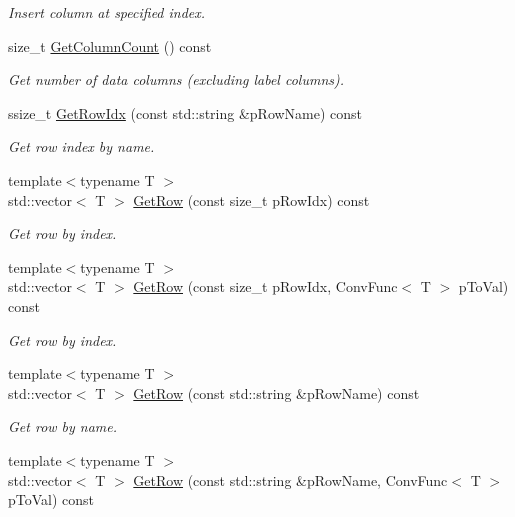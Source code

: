 \begin{DoxyCompactItemize}
\begin{DoxyCompactList}\small\item\em Insert column at specified index. \end{DoxyCompactList}\item 
size\+\_\+t \hyperlink{classrapidcsv_1_1Document_ae56d9b1d6b3b0037371032ba0dc0ee5c}{Get\+Column\+Count} () const
\begin{DoxyCompactList}\small\item\em Get number of data columns (excluding label columns). \end{DoxyCompactList}\item 
ssize\+\_\+t \hyperlink{classrapidcsv_1_1Document_a9c0d1a978bb9b764d13722219b0f4886}{Get\+Row\+Idx} (const std\+::string \&p\+Row\+Name) const
\begin{DoxyCompactList}\small\item\em Get row index by name. \end{DoxyCompactList}\item 
{\footnotesize template$<$typename T $>$ }\\std\+::vector$<$ T $>$ \hyperlink{classrapidcsv_1_1Document_a1523dd4eab5d7268f5c7a64867001595}{Get\+Row} (const size\+\_\+t p\+Row\+Idx) const
\begin{DoxyCompactList}\small\item\em Get row by index. \end{DoxyCompactList}\item 
{\footnotesize template$<$typename T $>$ }\\std\+::vector$<$ T $>$ \hyperlink{classrapidcsv_1_1Document_a23eb34d1e433ef6d6bc5130f589c4d5a}{Get\+Row} (const size\+\_\+t p\+Row\+Idx, Conv\+Func$<$ T $>$ p\+To\+Val) const
\begin{DoxyCompactList}\small\item\em Get row by index. \end{DoxyCompactList}\item 
{\footnotesize template$<$typename T $>$ }\\std\+::vector$<$ T $>$ \hyperlink{classrapidcsv_1_1Document_a71e274f4c612ac74fc8804c0b90a5839}{Get\+Row} (const std\+::string \&p\+Row\+Name) const
\begin{DoxyCompactList}\small\item\em Get row by name. \end{DoxyCompactList}\item 
{\footnotesize template$<$typename T $>$ }\\std\+::vector$<$ T $>$ \hyperlink{classrapidcsv_1_1Document_aedfb81004014592afbc900c7bfad5b0b}{Get\+Row} (const std\+::string \&p\+Row\+Name, Conv\+Func$<$ T $>$ p\+To\+Val) const

\end{DoxyCompactItemize}
